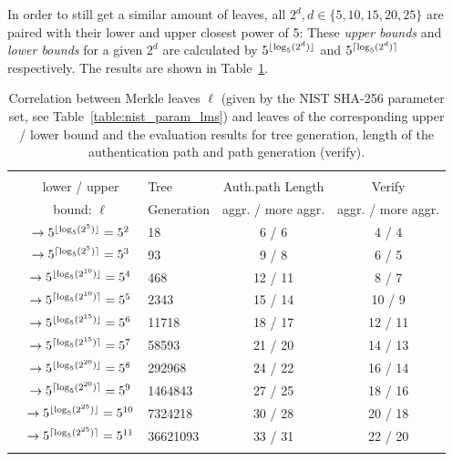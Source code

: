 In order to still get a similar amount of leaves, all $2^d, d \in \{5,10,15,20,25\}$ are paired with their lower and upper closest power of 5:
These \textit{upper bounds} and \textit{lower bounds} for a given $2^d$ are calculated by $5^{\lfloor\log_5(2^d)\rfloor}$ and $5^{\lceil\log_5(2^d)\rceil}$ respectively. The results are shown in Table~\ref{table:nist_upper_lower_bound}. 

\begin{table}
\centering
\begin{tabular}{r c l c c} 
 \hline\noalign{\smallskip}
 \multicolumn{5}{c}{\textbf{Merkle Tree - Lower / Upper Bound \extree}} \\
 \noalign{\smallskip} 
 & lower / upper  & Tree & Auth.path Length & Verify \\
 \noalign{\smallskip}
 & bound: $\ell$  & Generation & aggr. / more aggr. & aggr. / more aggr.\\
 \hline\noalign{\smallskip}
 \multirow{2}{*}{$2^5$} & $\rightarrow 5^{\lfloor\log_5(2^5)\rfloor} = 5^{2} $ & 18 & 6 / 6 & 4 / 4 \\
 & $\rightarrow 5^{\lceil\log_5(2^5)\rceil} = 5^{3}$ & 93 & 9 / 8 & 6 / 5 \\
 \hline\noalign{\smallskip} 
 \multirow{2}{*}{$2^{10}$} & $\rightarrow 5^{\lfloor\log_5(2^{10})\rfloor} = 5^{4}$ & 468 & 12 / 11 & 8 / 7 \\
 & $\rightarrow 5^{\lceil\log_5(2^{10})\rceil} = 5^{5}$ & 2343 & 15 / 14 & 10 / 9 \\
 \hline\noalign{\smallskip} 
 \multirow{2}{*}{$2^{15}$}& $\rightarrow 5^{\lfloor\log_5(2^{15})\rfloor} = 5^{6}$ & 11718 & 18 / 17 & 12 / 11 \\ 
 & $\rightarrow 5^{\lceil\log_5(2^{15})\rceil} = 5^{7}$ & 58593 & 21 / 20 & 14 / 13 \\ 
 \hline\noalign{\smallskip} 
 \multirow{2}{*}{$2^{20}$} & $\rightarrow 5^{\lfloor\log_5(2^{20})\rfloor} = 5^{8}$ & 292968 & 24 / 22 & 16 / 14 \\ 
 & $\rightarrow 5^{\lceil\log_5(2^{20})\rceil} = 5^{9}$ & 1464843 & 27 / 25 & 18 / 16 \\
 \hline\noalign{\smallskip}  
  \multirow{2}{*}{$2^{25}$} & $\rightarrow 5^{\lfloor\log_5(2^{25})\rfloor} =  5^{10}$ & 7324218 & 30 / 28 & 20 / 18 \\ 
 & $\rightarrow 5^{\lceil\log_5(2^{25})\rceil} = 5^{11}$ & 36621093 & 33 / 31 & 22 / 20 \\
 \hline\noalign{\smallskip}
 \end{tabular}
\caption{Correlation between Merkle leaves $\ell$ (given by the NIST SHA-256 parameter set, see Table~\ref{table:nist_param_lms}) and leaves of the corresponding upper / lower bound \extree and the evaluation results for tree generation, length of the authentication path and path generation (verify).}
\label{table:nist_upper_lower_bound}
\end{table}

